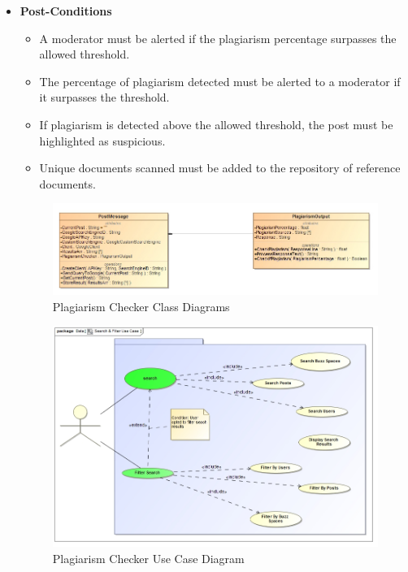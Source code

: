 \documentclass[11pt]{article}
\begin{document}
\begin{enumerate}
\begin{itemize}
\begin{itemize}
		  	\end{itemize}
		\item	\textbf{Post-Conditions}
		  	\begin{itemize}
	  			\item A moderator must be alerted if the plagiarism percentage surpasses the allowed threshold.
		  		\item The percentage of plagiarism detected must be alerted to a moderator if it surpasses the threshold.
	 			\item If plagiarism is detected above the allowed threshold, the post must be highlighted as suspicious.
		  		\item Unique documents scanned must be added to the repository of reference documents.
		  	\end{itemize}
		  	\newpage
	  			\begin{figure}[H]
	  				\includegraphics[scale=0.5,center]{InputOutput.jpg}
    					\caption{Plagiarism Checker Class Diagrams}
				\end{figure}
				\begin{figure}[H]
		    			\includegraphics[scale=0.4,center]{UseCase.jpg}
					\caption{Plagiarism Checker Use Case Diagram}
				\end{figure}
				\begin{figure}[H]

\end{figure}
\end{itemize}
\end{enumerate}
\end{document}
